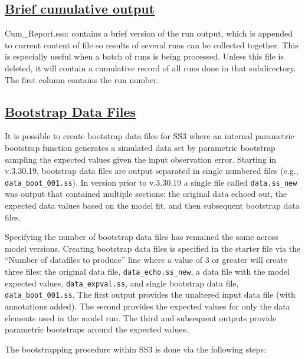 \hypertarget{CumulativeOutput}{}
\subsection[Brief cumulative output]{\protect\hyperlink{CumulativeOutput}{Brief cumulative output}}
Cum\_Report.sso: contains a brief version of the run output, which is appended to current content of file so results of several runs can be collected together. This is especially useful when a batch of runs is being processed. Unless this file is deleted, it will contain a cumulative record of all runs done in that subdirectory. The first column contains the run number.  

\hypertarget{bootstrap}{}
\subsection[Bootstrap Data Files]{\protect\hyperlink{bootstrap}{Bootstrap Data Files}}
It is possible to create bootstrap data files for SS3 where an internal parametric bootstrap function generates a simulated data set by parametric bootstrap sampling the expected values given the input observation error. Starting in v.3.30.19, bootstrap data files are output separated in single numbered files (e.g., \texttt{data\_boot\_001.ss}). In version prior to v.3.30.19 a single file called \texttt{data.ss\_new} was output that contained multiple sections:  the original data echoed out, the expected data values based on the model fit, and then subsequent bootstrap data files. 

Specifying the number of bootstrap data files has remained the same across model versions. Creating bootstrap data files is specified in the starter file via the ``Number of datafiles to produce'' line where a value of 3 or greater will create three files: the original data file, \texttt{data\_echo.ss\_new}, a data file with the model expected values, \texttt{data\_expval.ss}, and single bootstrap data file, \texttt{data\_boot\_001.ss}. The first output provides the unaltered input data file (with annotations added). The second provides the expected values for only the data elements used in the model run. The third and subsequent outputs provide parametric bootstraps around the expected values. 

The bootstrapping procedure within SS3 is done via the following steps:

